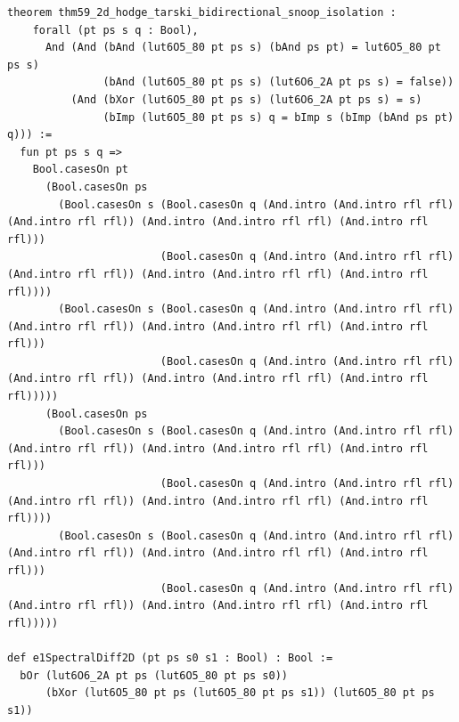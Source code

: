 \documentclass[11pt,letterpaper]{article}
\theoremstyle{spectralthm}
\begin{document}
\begin{lstlisting}[language=Lean4,caption={Standalone Pure Init.Prelude Term-Mode Lean 4 Kernel Suite (thm30--thm61, v0.0.0, 0 sorry, 0 axioms).},label={lst:lean_unified}]
theorem thm59_2d_hodge_tarski_bidirectional_snoop_isolation :
    forall (pt ps s q : Bool),
      And (And (bAnd (lut6O5_80 pt ps s) (bAnd ps pt) = lut6O5_80 pt ps s)
               (bAnd (lut6O5_80 pt ps s) (lut6O6_2A pt ps s) = false))
          (And (bXor (lut6O5_80 pt ps s) (lut6O6_2A pt ps s) = s)
               (bImp (lut6O5_80 pt ps s) q = bImp s (bImp (bAnd ps pt) q))) :=
  fun pt ps s q =>
    Bool.casesOn pt
      (Bool.casesOn ps
        (Bool.casesOn s (Bool.casesOn q (And.intro (And.intro rfl rfl) (And.intro rfl rfl)) (And.intro (And.intro rfl rfl) (And.intro rfl rfl)))
                        (Bool.casesOn q (And.intro (And.intro rfl rfl) (And.intro rfl rfl)) (And.intro (And.intro rfl rfl) (And.intro rfl rfl))))
        (Bool.casesOn s (Bool.casesOn q (And.intro (And.intro rfl rfl) (And.intro rfl rfl)) (And.intro (And.intro rfl rfl) (And.intro rfl rfl)))
                        (Bool.casesOn q (And.intro (And.intro rfl rfl) (And.intro rfl rfl)) (And.intro (And.intro rfl rfl) (And.intro rfl rfl)))))
      (Bool.casesOn ps
        (Bool.casesOn s (Bool.casesOn q (And.intro (And.intro rfl rfl) (And.intro rfl rfl)) (And.intro (And.intro rfl rfl) (And.intro rfl rfl)))
                        (Bool.casesOn q (And.intro (And.intro rfl rfl) (And.intro rfl rfl)) (And.intro (And.intro rfl rfl) (And.intro rfl rfl))))
        (Bool.casesOn s (Bool.casesOn q (And.intro (And.intro rfl rfl) (And.intro rfl rfl)) (And.intro (And.intro rfl rfl) (And.intro rfl rfl)))
                        (Bool.casesOn q (And.intro (And.intro rfl rfl) (And.intro rfl rfl)) (And.intro (And.intro rfl rfl) (And.intro rfl rfl)))))

def e1SpectralDiff2D (pt ps s0 s1 : Bool) : Bool :=
  bOr (lut6O6_2A pt ps (lut6O5_80 pt ps s0))
      (bXor (lut6O5_80 pt ps (lut6O5_80 pt ps s1)) (lut6O5_80 pt ps s1))


\end{lstlisting}
\end{document}
